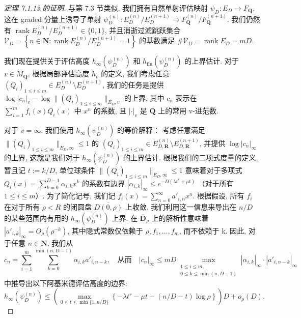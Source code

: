 \begin{proof}[定理 7.1.13 的证明]
与第 7.3 节类似, 我们拥有自然单射评估映射 \(\psi_D: E_D \to F_{\mathbf{Q}}\), 
这在 graded 分量上诱导了单射 \(\psi_D^{(n)}: E_D^{(n)}/E_D^{(n+1)} \to F_{\mathbf{Q}}^{(n)}/F_{\mathbf{Q}}^{(n+1)}\). 
我们仍然有 \(\operatorname{rank} E_D^{(n)}/E_D^{(n+1)} \in \{0,1\}\), 
并且消逝过滤跳跃集合 \(\mathcal{V}_D = \left\{n \in \mathbf{N} : \operatorname{rank} E_D^{(n)}/E_D^{(n+1)} = 1\right\}\) 的基数满足 \(\#\mathcal{V}_D = \operatorname{rank} E_D = mD\).

我们现在提供关于评估高度 \(h_{\infty}(\psi_D^{(n)})\) 和 \(h_{\text{fin}}(\psi_D^{(n)})\) 的上界估计. 
对于 \(v \in M_{\mathbf{Q}}\), 根据局部评估高度 \(h_v\) 的定义, 
我们考虑任意 \((Q_i)_{1 \leq i \leq m} \in E_D^{(n)} \setminus E_D^{(n+1)}\), 
我们的任务是提供 \(\log |c_n|_v - \log \|(Q_i)_{1 \leq i \leq m}\|_{E_D,v}\) 的上界, 
其中 \(c_n\) 表示在 \(\sum_{i=1}^m f_i(x)Q_i(x)\) 中 \(x^n\) 的系数, 
且 \(|\cdot|_v\) 是 \(\mathbf{Q}\) 上的常用 v-进范数.

对于 \(v=\infty\), 我们使用 \(h_{\infty}(\psi_D^{(n)})\) 的等价解释：
考虑任意满足 \(\|(Q_i)_{1\leq i\leq m}\|_{E_D,\infty}\leq 1\) 
的 \((Q_i)_{1\leq i\leq m}\in E_{D,\mathbf{R}}^{(n)}\setminus E_{D,\mathbf{R}}^{(n+1)}\), 
并提供 \(\log |c_n|_{\infty}\) 的上界, 这就是我们对于 \(h_{\infty}(\psi_D^{(n)})\) 的上界估计. 
根据我们的二项式度量的定义, 暂且记 \(t:=k/D\), 
单位球条件 \(\|(Q_i)_{1\leq i\leq m}\|_{E_D,\infty}\leq 1\) 
意味着对于多项式 \(Q_i(x)=\sum_{k=0}^{D-1}\alpha_{i,k}x^k\) 的系数有边界 \(|\alpha_{i,k}|_{\infty}\leq e^{-D(\lambda t^r+\mu t)}\) （对于所有 \(1\leq i\leq m\)）. 
为了简化记号, 我们记 \(f_i(x) = \sum_{n=0}^{\infty} a'_{i,n} x^n\). 
根据假设, 所有 \(f_i\) 在对于所有 \(\rho < R\) 的闭圆盘 \(\overline{D(0,\rho)}\) 上收敛. 
我们利用这一信息来导出在 \(n/D\) 的某些范围内有用的 \(h_{\infty}(\psi_D^{(n)})\) 上界. 
在 \(\overline{\mathbf{D}}_{\rho}\) 上的解析性意味着 \(|a'_{i,k}|_{\infty} = O_{\rho}(\rho^{-k})\), 
其中隐式常数仅依赖于 \(\rho, f_1, \ldots, f_m\), 而不依赖于 k. 
因此, 对于任意 \(n \in \mathbf{N}\), 我们从
\[ c_n = \sum_{i=1}^m \sum_{k=0}^{\min(n,D-1)} \alpha_{i,k} a'_{i,n-k}, \quad \text{从而} \quad |c_n|_{\infty} \leq mD \max_{\substack{1 \leq i \leq m, \\ 0 \leq k \leq \min(n,D-1)}} |\alpha_{i,k}|_{\infty} \cdot |a'_{i,n-k}|_{\infty} \]
中推导出以下阿基米德评估高度的边界:
\begin{equation}\label{eq:7.5.2}
h_{\infty}(\psi_D^{(n)}) \le \left(\max_{0 \le t \le \min\{1, n/D\}} \left\{ -\lambda t^r - \mu t - (n/D - t) \log \rho \right\} \right) D + o_{\rho}(D).
\end{equation}


\end{proof}
